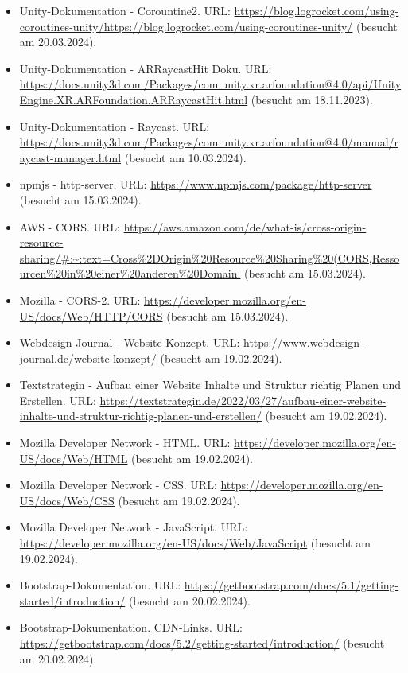 \begin{itemize}[leftmargin=0pt]
    \item Unity-Dokumentation - Corountine2. {\scriptsize URL:} \url{https://blog.logrocket.com/using-coroutines-unity/https://blog.logrocket.com/using-coroutines-unity/} (besucht am 20.03.2024).
    \item Unity-Dokumentation - ARRaycastHit Doku. {\scriptsize URL:}  \url{https://docs.unity3d.com/Packages/com.unity.xr.arfoundation@4.0/api/UnityEngine.XR.ARFoundation.ARRaycastHit.html} (besucht am 18.11.2023).
    \item Unity-Dokumentation - Raycast. {\scriptsize URL:} \url{https://docs.unity3d.com/Packages/com.unity.xr.arfoundation@4.0/manual/raycast-manager.html} (besucht am 10.03.2024).
    \item npmjs - http-server. {\scriptsize URL:} \url{https://www.npmjs.com/package/http-server} (besucht am 15.03.2024).
    \item AWS - CORS. {\scriptsize URL:} \url{https://aws.amazon.com/de/what-is/cross-origin-resource-sharing/#:~:text=Cross%2DOrigin%20Resource%20Sharing%20(CORS,Ressourcen%20in%20einer%20anderen%20Domain.} (besucht am 15.03.2024).
    \item Mozilla - CORS-2. {\scriptsize URL:} \url{https://developer.mozilla.org/en-US/docs/Web/HTTP/CORS} (besucht am 15.03.2024).
    \item Webdesign Journal - Website Konzept. {\scriptsize URL:} \url{https://www.webdesign-journal.de/website-konzept/} (besucht am 19.02.2024).
    \item Textstrategin - Aufbau einer Website Inhalte und Struktur richtig Planen und Erstellen. {\scriptsize URL:} \url{https://textstrategin.de/2022/03/27/aufbau-einer-website-inhalte-und-struktur-richtig-planen-und-erstellen/} (besucht am 19.02.2024).
    \item Mozilla Developer Network - HTML. {\scriptsize URL:} \url{https://developer.mozilla.org/en-US/docs/Web/HTML} (besucht am 19.02.2024).
    \item Mozilla Developer Network - CSS. {\scriptsize URL:} \url{https://developer.mozilla.org/en-US/docs/Web/CSS} (besucht am 19.02.2024).
    \item Mozilla Developer Network - JavaScript. {\scriptsize URL:} \url{https://developer.mozilla.org/en-US/docs/Web/JavaScript} (besucht am 19.02.2024).
    \item Bootstrap-Dokumentation. {\scriptsize URL:} \url{https://getbootstrap.com/docs/5.1/getting-started/introduction/} (besucht am 20.02.2024).
    \item Bootstrap-Dokumentation. CDN-Links. {\scriptsize URL:} \url{https://getbootstrap.com/docs/5.2/getting-started/introduction/} (besucht am 20.02.2024).

\end{itemize}
